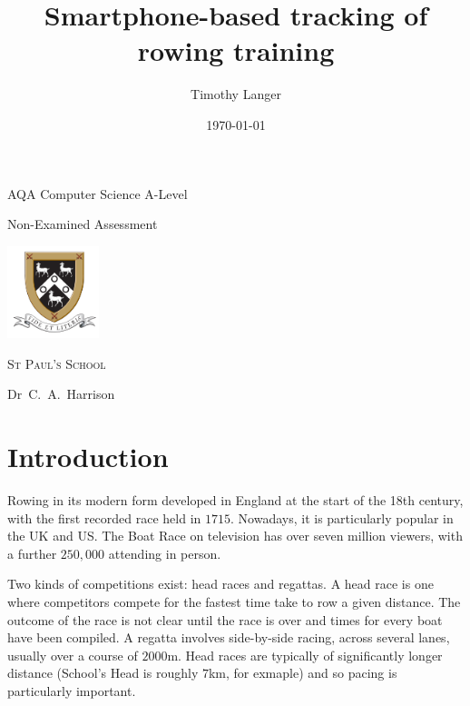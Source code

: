 \documentclass[11pt,twoside,a4paper]{report}
\author{Timothy Langer}
\title{Smartphone-based tracking of rowing training}
\date{\today}
\begin{document}
\begin{titlepage}
  \centering
  \vspace*{1cm}
  {\bfseries \huge \@title \par}
  \vspace{2cm}
  {\large AQA Computer Science A-Level \par Non-Examined Assessment \par}
  \vspace{1.5cm}
  {\LARGE \@author \par}
  \vfill
  \includegraphics[width=0.2\textwidth]{sps-logo} \par
  {\scshape\LARGE St Paul's School \par}
  Dr~C.~A.~Harrison \par
  \vspace{1cm}
  {\large \@date \par}
  \vspace*{1cm}
\end{titlepage}

\makeatother

\tableofcontents

\chapter{Introduction}

Rowing in its modern form developed in England at the start of the 18th century, with the first recorded race held in $1715$. 
Nowadays, it is particularly popular in the UK and US. 
The Boat Race on television has over seven million viewers, with a further $250,000$ attending in person.\cite{the_boat_race} 

Two kinds of competitions exist: head races and regattas. 
A head race is one where competitors compete for the fastest time take to row a given distance. 
The outcome of the race is not clear until the race is over and times for every boat have been compiled.
A regatta involves side-by-side racing, across several lanes, usually over a course of $2000 \si{\meter}$.
Head races are typically of significantly longer distance (School's Head is roughly $7$km, for exmaple) and so pacing is particularly important.
\end{document}
